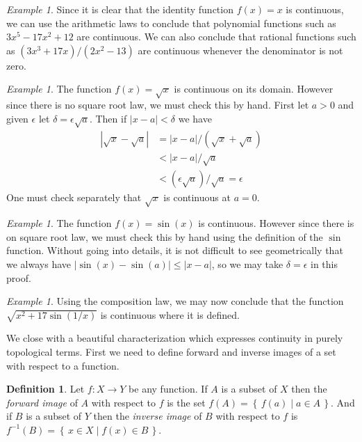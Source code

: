 \documentclass[11pt,oneside]{amsbook}
\newcommand{\set}[1]{\left\{\,#1\,\right\}}
\theoremstyle{definition}
\theoremstyle{plain}
\theoremstyle{definition}
\newtheorem{defn}[thm]{Definition}
\theoremstyle{remark}
\newtheorem{example}[thm]{Example}
\numberwithin{equation}{section}
\numberwithin{figure}{section}
\begin{document}
\begin{example}
  Since it is clear that the identity function $f(x)=x$ is continuous, we can use the arithmetic laws to conclude that polynomial functions such as $3x^5-17x^2+12$ are continuous. We can also conclude that rational functions such as $(3x^3+17x)/(2x^2-13)$ are continuous whenever the denominator is not zero.
\end{example}

\begin{example}
  The function $f(x)=\sqrt{x}$ is continuous on its domain. However since there is no square root law, we must check this by hand. First let $a>0$ and given $\epsilon$ let $\delta=\epsilon\sqrt{a}$. Then if $|x-a|<\delta$ we have
  \begin{align*}
    |\sqrt{x}-\sqrt{a}|&=|x-a|/(\sqrt{x}+\sqrt{a})\\
                       &<|x-a|/\sqrt{a}\\
                       &<(\epsilon\sqrt{a})/\sqrt{a}=\epsilon
  \end{align*}
  One must check separately that $\sqrt{x}$ is continuous at $a=0$.
\end{example}

\begin{example}
  The function $f(x)=\sin(x)$ is continuous. However since there is on square root law, we must check this by hand using the definition of the $\sin$ function. Without going into details, it is not difficult to see geometrically that we always have $|\sin(x)-\sin(a)|\leq|x-a|$, so we may take $\delta=\epsilon$ in this proof.
\end{example}

\begin{example}
  Using the composition law, we may now conclude that the function $\sqrt{x^2+17\sin(1/x)}$ is continuous where it is defined.
\end{example}

We close with a beautiful characterization which expresses continuity in purely topological terms. First we need to define forward and inverse images of a set with respect to a function.

\begin{defn}
  Let $f\colon X\to Y$ be any function. If $A$ is a subset of $X$ then the \emph{forward image} of $A$ with respect to $f$ is the set $f(A)=\set{f(a)\mid a\in A}$. And if $B$ is a subset of $Y$ then the \emph{inverse image} of $B$ with respect to $f$ is $f^{-1}(B)=\set{x\in X\mid f(x)\in B}$.
\end{defn}
\end{document}
